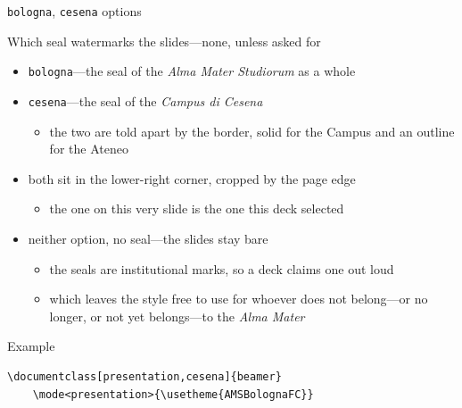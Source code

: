 \begin{frame}[c,fragile]{\texttt{bologna}, \texttt{cesena} options}
%
\begin{alertblock}{Which seal watermarks the slides---none, unless asked for}
\begin{itemize}
	\item \texttt{bologna}---the seal of the \emph{Alma Mater Studiorum} as a whole
	\item \texttt{cesena}---the seal of the \emph{Campus di Cesena}
	\begin{itemize}
		\item the two are told apart by the border, solid for the Campus and an outline for the Ateneo
	\end{itemize}
	\item both sit in the lower-right corner, cropped by the page edge
	\begin{itemize}
		\item the one on this very slide is the one this deck selected
	\end{itemize}
	\item \alert{neither option, no seal}---the slides stay bare
	\begin{itemize}
		\item the seals are institutional marks, so a deck claims one out loud
		\item which leaves the style free to use for whoever does not belong---or no longer, or not yet belongs---to the \emph{Alma Mater}
	\end{itemize}
\end{itemize}
\end{alertblock}
%
\begin{exampleblock}{Example}
{\footnotesize\begin{verbatim}
\documentclass[presentation,cesena]{beamer}
    \mode<presentation>{\usetheme{AMSBolognaFC}}
\end{verbatim}} %
\end{exampleblock}
%
\end{frame}
